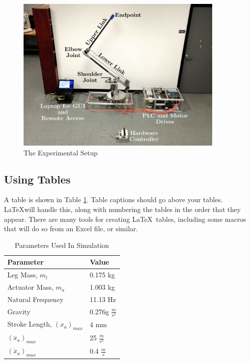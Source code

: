 \documentclass[11pt]{article}
\begin{document}
\begin{figure}[tbp]
\begin{center}
\includegraphics[width = 4in]{figures/Cherrypicker_labeled}
\caption{The Experimental Setup}
\label{fig:cherrypicker_labeled}
\end{center}
\vspace{-0.2in}
\end{figure}
%

\subsection{Using Tables}
\label{sec:tables}
\vspace{-0.2in}
%
A table is shown in Table \ref{table:sim_parameters}. Table captions should go above your tables. \LaTeX will handle this, along with numbering the tables in the order that they appear. There are many tools for creating \LaTeX\ tables, including some macros that will do so from an Excel file, or similar. 

\begin{table}
\label{table:sim_parameters}
\begin{center}
\caption{Parameters Used In Simulation}
\vspace{0.1in}
\begin{tabular}{ll}
\hline
\hline
Parameter & Value  \\
\hline
Leg Mass, $m_l$ & 0.175 kg \\
Actuator Mass, $m_a$ & 1.003 kg  \\
Natural Frequency & 11.13 Hz \\
Gravity  & 0.276g $\frac{m}{s^2}$ \\[1ex]
\hline
Stroke Length, $(x_a)_{max}$ & 4 mm \\
$(\ddot{x}_a)_{max}$ & 25 $\frac{m}{s^2}$ \\
$(\dot{x}_a)_{max}$ & 0.4 $\frac{m}{s}$ \\
\end{tabular}
\end{center}
\end{table}
\end{document}
